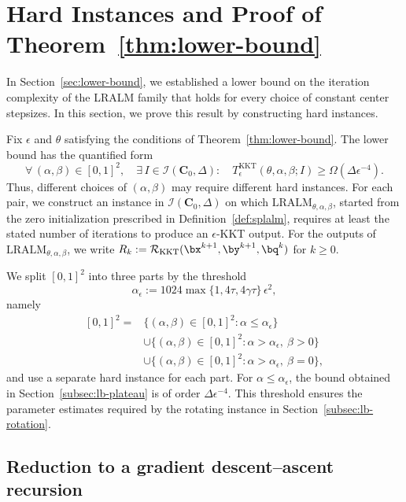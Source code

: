 \section{Hard Instances and Proof of Theorem~\ref{thm:lower-bound}}
\label{sec:lb-proof}

In Section~\ref{sec:lower-bound}, we established a lower bound on the iteration
complexity of the LRALM family that holds for every choice of constant center
stepsizes. In this section, we prove this result by constructing hard instances.

Fix \(\epsilon\) and \(\theta\) satisfying the conditions of
Theorem~\ref{thm:lower-bound}. The lower bound has the quantified form
\[
\forall\,(\alpha,\beta)\in[0,1]^2,\quad
\exists\,I\in\mathcal I(\mathbf C_0,\Delta):\quad
T^{\mathrm{KKT}}_\epsilon(\theta,\alpha,\beta;I)
\geq \Omega(\Delta\epsilon^{-4}).
\]
Thus, different choices of \((\alpha,\beta)\) may require different hard
instances. For each pair, we construct an instance in
\(\mathcal I(\mathbf C_0,\Delta)\) on which
\(\mathrm{LRALM}_{\theta,\alpha,\beta}\), started from the zero
initialization prescribed in Definition~\ref{def:splalm}, requires at least
the stated number of iterations to produce an \(\epsilon\)-KKT output.
For the outputs of \(\mathrm{LRALM}_{\theta,\alpha,\beta}\), we write
\(R_k:=\mathcal R_{\mathrm{KKT}}(\bx^{k+1},\by^{k+1},\bq^k)\) for \(k\ge0\).

We split \([0,1]^2\) into three parts by the threshold
\[
\alpha_\epsilon:=1024\max\{1,4\tau,4\gamma\tau\}\,\epsilon^2,
\]
namely
\[
\begin{aligned}
[0,1]^2
={}&\bigl\{(\alpha,\beta)\in[0,1]^2:\alpha\le\alpha_\epsilon\bigr\}\\
&\cup\bigl\{(\alpha,\beta)\in[0,1]^2:\alpha>\alpha_\epsilon,\ \beta>0\bigr\}\\
&\cup\bigl\{(\alpha,\beta)\in[0,1]^2:\alpha>\alpha_\epsilon,\ \beta=0\bigr\},
\end{aligned}
\]
and use a separate hard instance for each part. For
\(\alpha\le\alpha_\epsilon\), the bound obtained in
Section~\ref{subsec:lb-plateau} is of order \(\Delta\epsilon^{-4}\). This
threshold ensures the parameter estimates required by the rotating instance
in Section~\ref{subsec:lb-rotation}.

\subsection{Reduction to a gradient descent--ascent recursion}
\label{subsec:gda-embedding}

